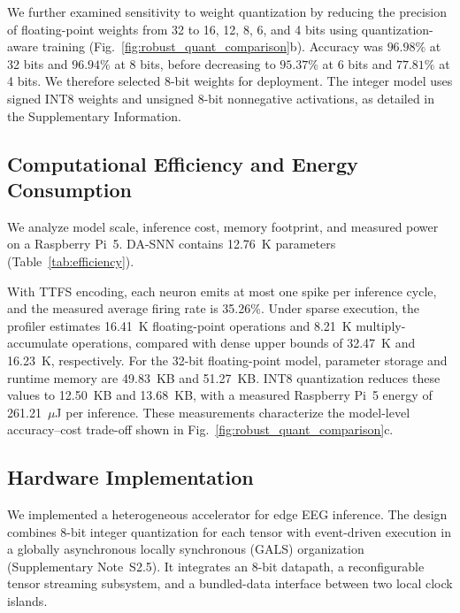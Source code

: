 ﻿\documentclass{nsr}
\begin{document}
We further examined sensitivity to weight quantization by reducing the precision of floating-point weights from 32 to 16, 12, 8, 6, and 4 bits using quantization-aware training (Fig.~\ref{fig:robust_quant_comparison}b). Accuracy was $96.98\%$ at 32 bits and $96.94\%$ at 8 bits, before decreasing to $95.37\%$ at 6 bits and $77.81\%$ at 4 bits. We therefore selected 8-bit weights for deployment. The integer model uses signed INT8 weights and unsigned 8-bit nonnegative activations, as detailed in the Supplementary Information.

\subsection{Computational Efficiency and Energy Consumption}

We analyze model scale, inference cost, memory footprint, and measured power on a Raspberry Pi~5. DA-SNN contains 12.76~K parameters (Table~\ref{tab:efficiency}).

With TTFS encoding, each neuron emits at most one spike per inference cycle, and the measured average firing rate is 35.26\%. Under sparse execution, the profiler estimates 16.41~K floating-point operations and 8.21~K multiply-accumulate operations, compared with dense upper bounds of 32.47~K and 16.23~K, respectively. For the 32-bit floating-point model, parameter storage and runtime memory are 49.83~KB and 51.27~KB. INT8 quantization reduces these values to 12.50~KB and 13.68~KB, with a measured Raspberry Pi~5 energy of 261.21~$\mu$J per inference. These measurements characterize the model-level accuracy--cost trade-off shown in Fig.~\ref{fig:robust_quant_comparison}c.



\subsection{Hardware Implementation}

We implemented a heterogeneous accelerator for edge EEG inference. The design combines 8-bit integer quantization for each tensor with event-driven execution in a globally asynchronous locally synchronous (GALS) organization (Supplementary Note~S2.5). It integrates an 8-bit datapath, a reconfigurable tensor streaming subsystem, and a bundled-data interface between two local clock islands.
\end{document}
